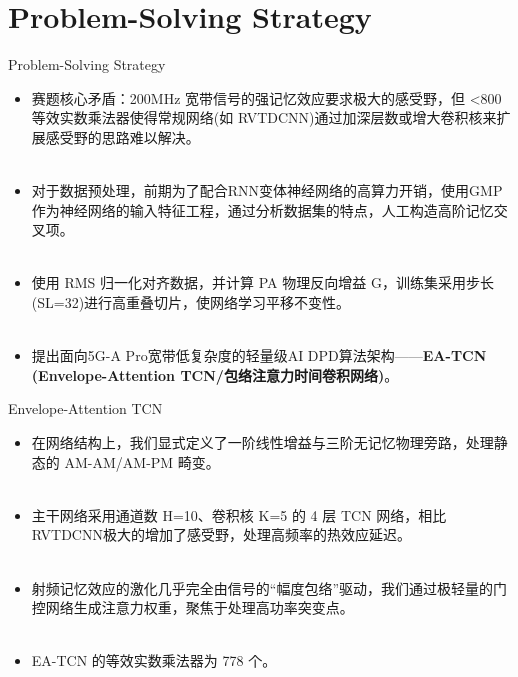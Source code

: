 \documentclass[20pt, cjk, slidetop, table]{beamer}
\begin{document}
    
\section{Problem-Solving Strategy}
\begin{frame}{Problem-Solving Strategy}
\begin{itemize}
    \item  赛题核心矛盾：200MHz 宽带信号的强记忆效应要求极大的感受野，但 <800 等效实数乘法器使得常规网络(如 RVTDCNN)通过加深层数或增大卷积核来扩展感受野的思路难以解决。 \\
    ~\\
    \item 对于数据预处理，前期为了配合RNN变体神经网络的高算力开销，使用GMP作为神经网络的输入特征工程，通过分析数据集的特点，人工构造高阶记忆交叉项。\\
~\\
    \item 使用 RMS 归一化对齐数据，并计算 PA 物理反向增益 G，训练集采用步长(SL=32)进行高重叠切片，使网络学习平移不变性。\\
    ~\\
    \item 提出面向5G-A Pro宽带低复杂度的轻量级AI DPD算法架构——\textbf{EA-TCN (Envelope-Attention TCN/包络注意力时间卷积网络)}。
    ~\\

    \end{itemize}
\end{frame}


    \begin{frame}{Envelope-Attention TCN}
    \begin{itemize}
    \item 在网络结构上，我们显式定义了一阶线性增益与三阶无记忆物理旁路，处理静态的 AM-AM/AM-PM 畸变。\\
    ~\\
    \item 主干网络采用通道数 H=10、卷积核 K=5 的 4 层 TCN 网络，相比RVTDCNN极大的增加了感受野，处理高频率的热效应延迟。 \\
~\\
    \item 射频记忆效应的激化几乎完全由信号的“幅度包络”驱动，我们通过极轻量的门控网络生成注意力权重，聚焦于处理高功率突变点。\\
    ~\\
    \item EA-TCN 的等效实数乘法器为 778 个。

     \end{itemize}
    \end{frame}
\end{document}
